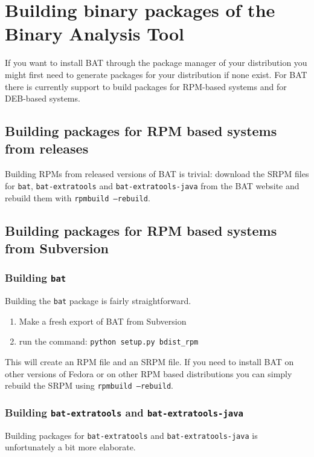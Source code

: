 \documentclass[10pt]{article}
\begin{document}
\section{Building binary packages of the Binary Analysis Tool}

If you want to install BAT through the package manager of your distribution you
might first need to generate packages for your distribution if none exist. For
BAT there is currently support to build packages for RPM-based systems and for
DEB-based systems.

\subsection{Building packages for RPM based systems from releases}

Building RPMs from released versions of BAT is trivial: download the SRPM
files for \texttt{bat}, \texttt{bat-extratools} and
\texttt{bat-extratools-java} from the BAT website and rebuild them with
\texttt{rpmbuild --rebuild}.

\subsection{Building packages for RPM based systems from Subversion}

\subsubsection{Building \texttt{bat}}

Building the \texttt{bat} package is fairly straightforward.

\begin{enumerate}
\item Make a fresh export of BAT from Subversion
\item run the command: \texttt{python setup.py bdist\_rpm}
\end{enumerate}

This will create an RPM file and an SRPM file. If you need to install BAT on
other versions of Fedora or on other RPM based distributions you can simply
rebuild the SRPM using \texttt{rpmbuild --rebuild}.

\subsubsection{Building \texttt{bat-extratools} and
\texttt{bat-extratools-java}}

Building packages for \texttt{bat-extratools} and \texttt{bat-extratools-java}
is unfortunately a bit more elaborate.
\end{document}

